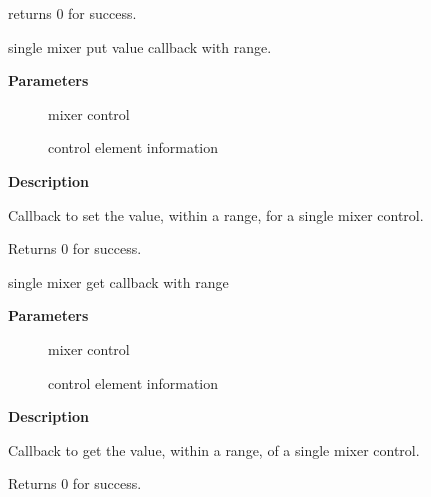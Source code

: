 \documentclass[a4paper,8pt,english]{sphinxmanual}
\begin{document}
returns 0 for success.

\begin{fulllineitems}
\label{sound/kernel-api/alsa-driver-api:c.snd_soc_put_volsw_range}
single mixer put value callback with range.

\end{fulllineitems}


\textbf{Parameters}
\begin{description}
\item[{}] \leavevmode
mixer control

\item[{}] \leavevmode
control element information

\end{description}

\textbf{Description}

Callback to set the value, within a range, for a single mixer control.

Returns 0 for success.

\begin{fulllineitems}
\label{sound/kernel-api/alsa-driver-api:c.snd_soc_get_volsw_range}
single mixer get callback with range

\end{fulllineitems}


\textbf{Parameters}
\begin{description}
\item[{}] \leavevmode
mixer control

\item[{}] \leavevmode
control element information

\end{description}

\textbf{Description}

Callback to get the value, within a range, of a single mixer control.

Returns 0 for success.
\end{document}
